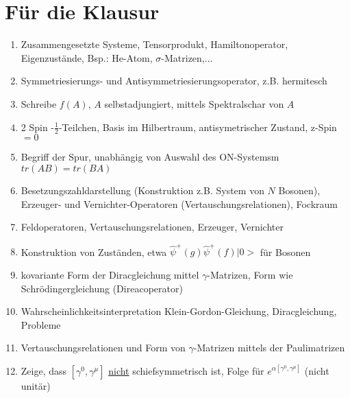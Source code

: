 \documentclass[twoside,a4paper]{scrartcl}
\renewcommand{\1}{\mathds{1}}
\begin{document}
% 
\section{Für die Klausur}
\begin{enumerate}
\item Zusammengesetzte Systeme, Tensorprodukt, Hamiltonoperator, Eigenzustände, Bsp.: He-Atom, $\sigma$-Matrizen,...
\item Symmetriesierungs- und Antisymmetriesierungsoperator, z.B. hermitesch
\item Schreibe $f(A)$, $A$ selbstadjungiert, mittels Spektralschar von $A$
\item 2 Spin -$\frac{1}{2}$-Teilchen, Basis im Hilbertraum, antisymetrischer Zustand, z-Spin$=0$
\item Begriff der Spur, unabhängig von Auswahl des ON-Systemsm $tr(AB)=tr(BA)$
\item Besetzungszahldarstellung (Konstruktion z.B. System von $N$ Bosonen), Erzeuger- und Vernichter-Operatoren (Vertauschungsrelationen), Fockraum
\item Feldoperatoren, Vertauschungsrelationen, Erzeuger, Vernichter
\item Konstruktion von Zuständen, etwa $\hat \psi^+(g)\hat \psi^+(f)|0>$ für Bosonen
\item kovariante Form der Diracgleichung mittel $\gamma$-Matrizen, Form wie Schrödingergleichung (Direacoperator)
\item Wahrscheinlichkeitsinterpretation Klein-Gordon-Gleichung, Diracgleichung, Probleme
\item Vertauschungsrelationen und Form von $\gamma$-Matrizen mittels der Paulimatrizen
\item Zeige, dass $[\gamma^0,\gamma^\mu]$ \underline{nicht} schiefsymmetrisch ist, Folge für $e^{\alpha[\gamma^0,\gamma^\mu]}$ (nicht unitär)
\end{enumerate}






\end{document}
